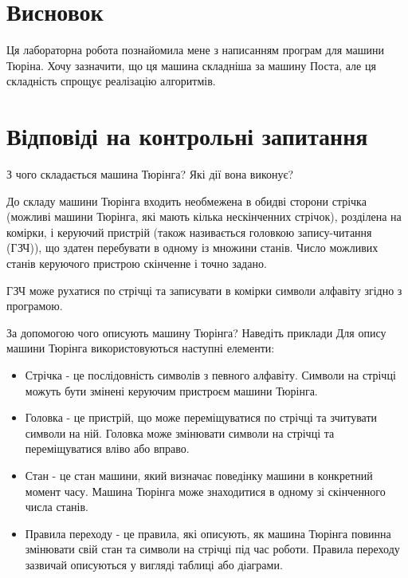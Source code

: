\documentclass[a4paper, 12pt, oneside]{extarticle}
\begin{document}
\section*{Висновок}

Ця лабораторна робота познайомила мене з написанням програм для машини Тюріна.
Хочу зазначити, що ця машина складніша за машину Поста, але ця складність
спрощує реалізацію алгоритмів.

\section*{Відповіді на контрольні запитання}
\begin{itemize}

	\question З чого складається машина Тюрінга? Які дії вона виконує?

\answer До складу машини Тюрінга входить необмежена в обидві сторони
стрічка (можливі машини Тюрінга, які мають кілька нескінченних стрічок),
розділена на комірки, і керуючий пристрій (також називається головкою
запису-читання (ГЗЧ)), що здатен перебувати в одному із множини станів.
Число можливих станів керуючого пристрою скінченне і точно задано.

ГЗЧ може рухатися по стрічці та записувати в комірки символи алфавіту
згідно з програмою.

	\question За допомогою чого описують машину Тюрінга? Наведіть приклади
	\answer Для опису машини Тюрінга використовуються наступні елементи:

		\begin{itemize}
			\item Стрічка - це послідовність символів з певного алфавіту. Символи на стрічці можуть бути змінені керуючим пристроєм машини Тюрінга.

			\item Головка - це пристрій, що може переміщуватися по стрічці та зчитувати символи на ній. Головка може змінювати символи на стрічці та переміщуватися вліво або вправо.

			\item Стан - це стан машини, який визначає поведінку машини в конкретний момент часу. Машина Тюрінга може знаходитися в одному зі скінченного числа станів.

			\item Правила переходу - це правила, які описують, як машина Тюрінга повинна змінювати свій стан та символи на стрічці під час роботи. Правила переходу зазвичай описуються у вигляді таблиці або діаграми.
		\end{itemize}


\end{itemize}
\end{document}
